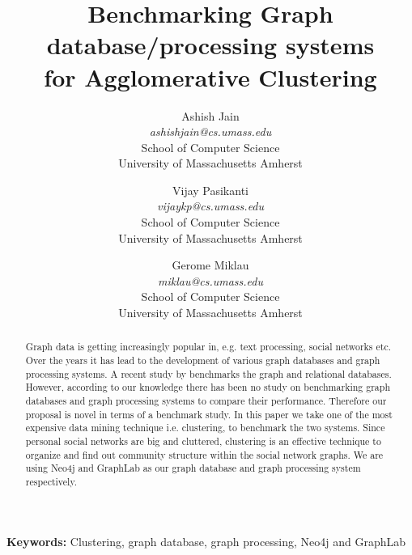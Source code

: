 \documentclass[11pt,onecolumn]{article}
\begin{document}
%
\title{Benchmarking Graph database/processing systems\\for Agglomerative Clustering}



\author{
 Ashish Jain\\
 \textit{ashishjain@cs.umass.edu}\\
School of Computer Science\\
University of Massachusetts Amherst\\
\and
 Vijay Pasikanti\\
 \textit{vijaykp@cs.umass.edu}\\
School of Computer Science\\
University of Massachusetts Amherst\\
\and
Gerome Miklau\\
\textit{miklau@cs.umass.edu}\\
School of Computer Science\\
University of Massachusetts Amherst\\
}
\maketitle

\begin{abstract}
Graph data is getting increasingly popular in, e.g. text processing, social networks etc. Over the years it has lead to the development of various graph databases and graph processing systems. A recent study by \cite{benchmark} benchmarks the graph and relational databases. However, according to our knowledge there has been no study on benchmarking graph databases and graph processing systems to compare their performance.  Therefore our proposal is novel in terms of a benchmark study. In this paper we take one of the most expensive data mining technique i.e. clustering, to benchmark the two systems. Since personal social networks are big and cluttered, clustering is an effective technique to organize and find out community structure within the social network graphs. We are using Neo4j and GraphLab as our graph database and graph processing system respectively.
\end{abstract}

\textbf{Keywords:} Clustering, graph database, graph processing, Neo4j and GraphLab
\end{document}

